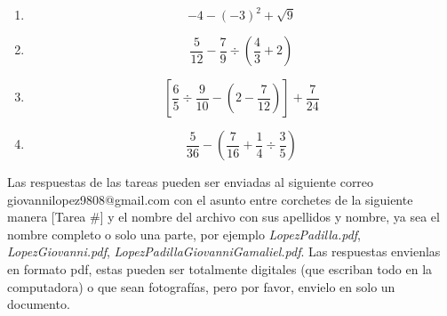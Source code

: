 \documentclass[12pt,letterpaper]{report}
\begin{document}
\begin{enumerate}
    \item \begin{equation*}
        -4-(-3)^2+\sqrt{9}
    \end{equation*}
    \item \begin{equation*}
    \frac{5}{12}- \frac{7}{9} \div (\frac{4}{3}+2)
    \end{equation*}
    \item \begin{equation*}
        \left[\frac{6}{5}\div \frac{9}{10}-\left(  2-\frac{7}{12}\right) \right] +\frac{7}{24}
    \end{equation*}
    \item \begin{equation*}
     \frac{5}{36}-\left(  \frac{7}{16}+\frac{1}{4}\div \frac{3}{5}\right)
    \end{equation*}
\end{enumerate}
Las respuestas de las tareas pueden ser enviadas al siguiente correo giovannilopez9808@gmail.com con el asunto entre corchetes de la siguiente manera [Tarea \#] y el nombre del archivo con sus apellidos y nombre, ya sea el nombre completo o solo una parte, por ejemplo \textit{LopezPadilla.pdf}, \textit{LopezGiovanni.pdf}, \textit{LopezPadillaGiovanniGamaliel.pdf}. Las respuestas envienlas en formato pdf, estas pueden ser totalmente digitales (que escriban todo en la computadora) o que sean fotografías, pero por favor, envielo en solo un documento.
\end{document}
